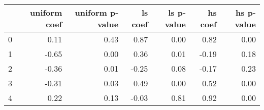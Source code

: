 \begin{tabular}{lrrrrrr}
\toprule
 & uniform coef & uniform p-value & ls coef & ls p-value & hs coef & hs p-value \\
\midrule
0 & 0.11 & 0.43 & 0.87 & 0.00 & 0.82 & 0.00 \\
1 & -0.65 & 0.00 & 0.36 & 0.01 & -0.19 & 0.18 \\
2 & -0.36 & 0.01 & -0.25 & 0.08 & -0.17 & 0.23 \\
3 & -0.31 & 0.03 & 0.49 & 0.00 & 0.52 & 0.00 \\
4 & 0.22 & 0.13 & -0.03 & 0.81 & 0.92 & 0.00 \\
\bottomrule
\end{tabular}
